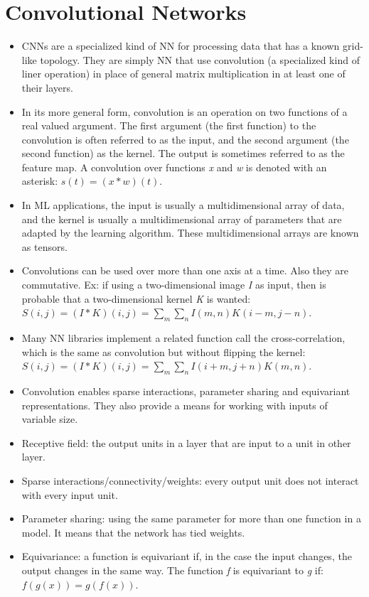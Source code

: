 \documentclass{article}
\begin{document}
\section{Convolutional Networks}
\begin{itemize}
\item CNNs are a specialized kind of NN for processing data that has a known grid-like topology. They are simply NN that use convolution (a specialized kind of liner operation) in place of general matrix multiplication in at least one of their layers.
\item In its more general form, convolution is an operation on two functions of a real valued argument. The first argument (the first function) to the convolution is often referred to as the input, and the second argument (the second function) as the kernel. The output is sometimes referred to as the feature map. A convolution over functions \textit{x} and \textit{w} is denoted with an asterisk: \(s(t) = (x * w)(t)\).
\item In ML applications, the input is usually a multidimensional array of data, and the kernel is usually a multidimensional array of parameters that are adapted by the learning algorithm. These multidimensional arrays are known as tensors.
\item Convolutions can be used over more than one axis at a time. Also they are commutative. Ex: if using a two-dimensional image \textit{I} as input, then is probable that a two-dimensional kernel \textit{K} is wanted: \(S(i, j) = (I * K)(i, j) = \sum_m \sum_n I(m, n)K(i - m, j - n)\).
\item Many NN libraries implement a related function call the cross-correlation, which is the same as convolution but without flipping the kernel: \(S(i, j) = (I * K)(i, j) = \sum_m \sum_n I(i + m, j + n)K(m, n)\).
\item Convolution enables sparse interactions, parameter sharing and equivariant representations. They also provide a means for working with inputs of variable size.
\item Receptive field: the output units in a layer that are input to a unit in other layer.
\item Sparse interactions/connectivity/weights: every output unit does not interact with every input unit.
\item Parameter sharing: using the same parameter for more than one function in a model. It means that the network has tied weights.
\item Equivariance: a function is equivariant if, in the case the input changes, the output changes in the same way. The function \textit{f} is equivariant to \textit{g} if: \(f(g(x)) = g(f(x))\).

\end{itemize}
\end{document}
